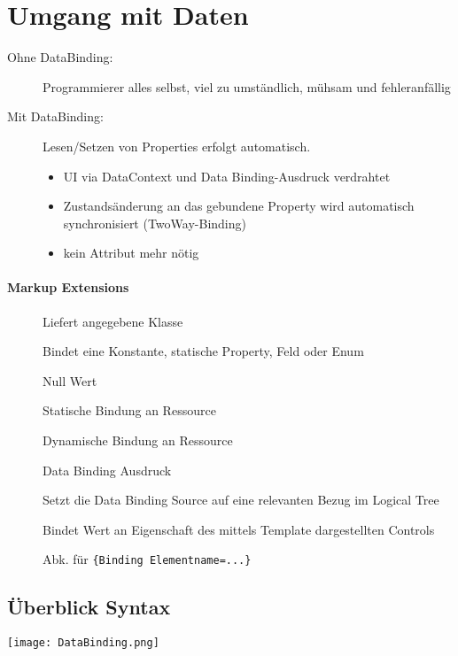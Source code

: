 \section{Umgang mit Daten}
\begin{description}
\item[Ohne DataBinding:] Programmierer alles selbst, viel zu umständlich, mühsam und fehleranfällig
\item[Mit DataBinding: ] Lesen/Setzen von Properties erfolgt automatisch.
\begin{itemize}
    \item UI via DataContext und Data Binding-Ausdruck verdrahtet
    \item Zustandsänderung an das gebundene Property wird automatisch synchronisiert (TwoWay-Binding)
    \item kein  Attribut mehr nötig
\end{itemize}
\end{description}

\paragraph{Markup Extensions}
\begin{description}
\item[] Liefert angegebene Klasse
\item[] Bindet eine Konstante, statische Property, Feld oder Enum
\item[] Null Wert
\item[] Statische Bindung an Ressource
\item[] Dynamische Bindung an Ressource
\item[] Data Binding Ausdruck
\item[] Setzt die Data Binding Source auf eine relevanten Bezug im Logical Tree
\item[] Bindet Wert an Eigenschaft des mittels Template dargestellten Controls
\item[] Abk. für \verb+{Binding Elementname=...}+
\end{description}

\subsection{Überblick Syntax}
\texttt{[image: DataBinding.png]}


